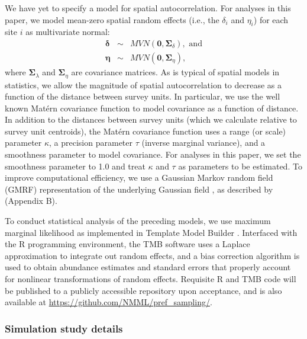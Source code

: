 \documentclass[times,mee,doublespace,]{besauth2}
\begin{document}
\begin{flushleft}
\hspace{0.5in} We have yet to specify a model for spatial autocorrelation.  For analyses in this paper, we model mean-zero spatial random effects (i.e., the $\delta_i$ and $\eta_i$) for each site $i$ as multivariate normal:
\begin{eqnarray*}
  \boldsymbol{\delta} & \sim & MVN(\textbf{0},\boldsymbol{\Sigma}_{\delta}), \text{ and} \\
  \boldsymbol{\eta} & \sim & MVN(\textbf{0},\boldsymbol{\Sigma}_{\eta}),
\end{eqnarray*}
where $\boldsymbol{\Sigma}_{\lambda}$ and $\boldsymbol{\Sigma}_{\eta}$ are covariance matrices.  As is typical of spatial models in statistics, we allow the magnitude of spatial autocorrelation to decrease as a function of the distance between survey units.  In particular, we use the well known Mat\'{e}rn covariance function to model covariance as a function of distance.  In addition to the distances between survey units (which we calculate relative to survey unit centroids), the Mat\'{e}rn covariance function uses a range (or scale) parameter $\kappa$, a precision parameter $\tau$ (inverse marginal variance), and a smoothness parameter to model covariance.  For analyses in this paper, we set the smoothness parameter to 1.0 and treat $\kappa$ and $\tau$ as parameters to be estimated.  To improve computational efficiency, we use a Gaussian Markov random field (GMRF) representation of the underlying Gaussian field \citep{LindgrenEtAl2011}, as described by \citet{ThorsonEtAl2015} (Appendix B).

\hspace{0.5in} To conduct statistical analysis of the preceding models, we use maximum marginal likelihood as implemented in Template Model Builder \citep[TMB; ][]{KristensenEtAl2015}. Interfaced with the R programming environment, the TMB software uses a Laplace approximation to integrate out random effects, and a bias correction algorithm \citep{TierneyEtAl1989,ThorsonKristensenInPress} is used to obtain abundance estimates and standard errors that properly account for nonlinear transformations of random effects.  Requisite R and TMB code will be published to a publicly accessible repository upon acceptance, and is also available at \url{https://github.com/NMML/pref_sampling/}.

\subsubsection*{Simulation study details}


\end{flushleft}
\end{document}
